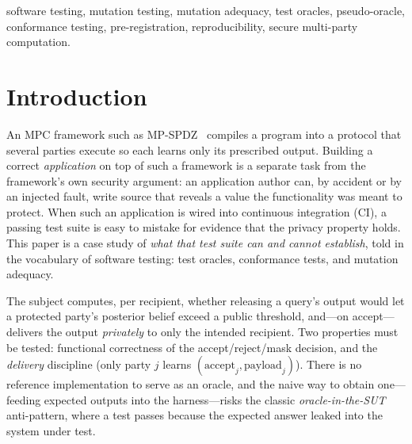 \documentclass[conference]{IEEEtran}
\begin{document}
\begin{IEEEkeywords}
software testing, mutation testing, mutation adequacy, test oracles, pseudo-oracle,
conformance testing, pre-registration, reproducibility, secure multi-party computation.
\end{IEEEkeywords}

\section{Introduction}
\label{sec:intro}
An MPC framework such as MP-SPDZ~\cite{keller2020mpspdz} compiles a program into a
protocol that several parties execute so each learns only its prescribed output.
Building a correct \emph{application} on top of such a framework is a separate task from
the framework's own security argument: an application author can, by accident or by an
injected fault, write source that reveals a value the functionality was meant to protect.
When such an application is wired into continuous integration (CI), a passing test suite
is easy to mistake for evidence that the privacy property holds. This paper is a case
study of \emph{what that test suite can and cannot establish}, told in the vocabulary of
software testing: test oracles, conformance tests, and mutation adequacy.

The subject computes, per recipient, whether releasing a query's output would let a
protected party's posterior belief exceed a public threshold, and---on accept---delivers
the output \emph{privately} to only the intended recipient. Two properties must be
tested: functional correctness of the accept/reject/mask decision, and the
\emph{delivery} discipline (only party $j$ learns $(\text{accept}_j,
\text{payload}_j)$). There is no reference implementation to serve as an oracle, and the
naive way to obtain one---feeding expected outputs into the harness---risks the classic
\emph{oracle-in-the-SUT} anti-pattern, where a test passes because the expected answer
leaked into the system under test.
\end{document}
